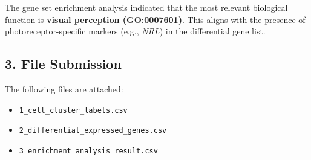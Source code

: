 The gene set enrichment analysis indicated that the most relevant biological function is \textbf{visual perception (GO:0007601)}. This aligns with the presence of photoreceptor-specific markers (e.g., \textit{NRL}) in the differential gene list.

\subsection*{3. File Submission}
The following files are attached:
\begin{itemize}
    \item \texttt{1\_cell\_cluster\_labels.csv}
    \item \texttt{2\_differential\_expressed\_genes.csv}
    \item \texttt{3\_enrichment\_analysis\_result.csv}
\end{itemize}


